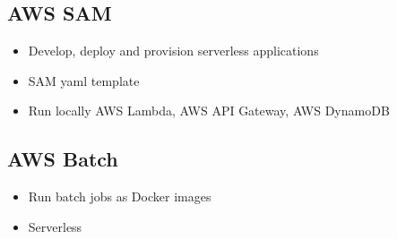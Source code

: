 \documentclass[../../main.tex]{subfiles}
\begin{document}
\subsection{AWS SAM}
\begin{itemize}
    \item Develop, deploy and provision serverless applications
    \item SAM yaml template
    \item Run locally AWS Lambda, AWS API Gateway, AWS DynamoDB
\end{itemize}

\subsection{AWS Batch}
\begin{itemize}
    \item Run batch jobs as Docker images
    \item Serverless
\end{itemize}
\end{document}
